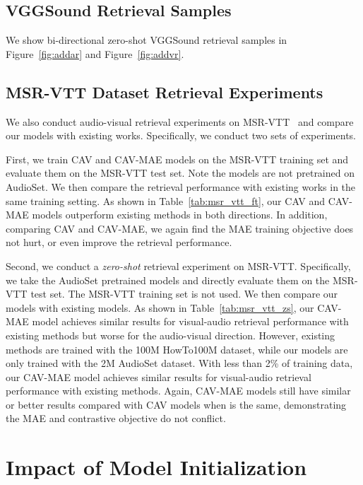 \documentclass{article} \usepackage{iclr2023_conference,times}
\begin{document}
\subsection{VGGSound Retrieval Samples}

We show bi-directional zero-shot VGGSound retrieval samples in Figure~\ref{fig:addar} and Figure~\ref{fig:addvr}.

\subsection{MSR-VTT Dataset Retrieval Experiments}

We also conduct audio-visual retrieval experiments on MSR-VTT~\citep{xu2016msr} and compare our models with existing works. Specifically, we conduct two sets of experiments.

First, we train CAV and CAV-MAE models on the MSR-VTT training set and evaluate them on the MSR-VTT test set. Note the models are not pretrained on AudioSet. We then compare the retrieval performance with existing works in the same training setting. As shown in Table~\ref{tab:msr_vtt_ft}, our CAV and CAV-MAE models outperform existing methods in both directions. In addition, comparing CAV and CAV-MAE, we again find the MAE training objective does not hurt, or even improve the retrieval performance.


Second, we conduct a \emph{zero-shot} retrieval experiment on MSR-VTT. Specifically, we take the AudioSet pretrained models and directly evaluate them on the MSR-VTT test set. The MSR-VTT training set is not used. We then compare our models with existing models. As shown in Table~\ref{tab:msr_vtt_zs}, our CAV-MAE model achieves similar results for visual-audio retrieval performance with existing methods but worse for the audio-visual direction. However, existing methods are trained with the 100M HowTo100M dataset, while our models are only trained with the 2M AudioSet dataset. With less than 2\% of training data, our CAV-MAE model achieves similar results for visual-audio retrieval performance with existing methods. Again, CAV-MAE models still have similar or better results compared with CAV models when  is the same, demonstrating the MAE and contrastive objective do not conflict.

\section{Impact of Model Initialization}
\label{sec:mdl_init}
\end{document}
